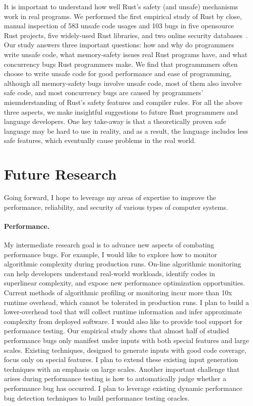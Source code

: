 \documentclass[10pt]{article}
\begin{document}
It is important to understand how well Rust’s safety (and
unsafe) mechanisms work in real programs. We performed
the first empirical study of Rust by close, manual inspection of 583 unsafe code usages 
and 103 bugs in five opensource Rust projects, five widely-used Rust libraries, and two
online security databases~\cite{sosp-boqin}. Our study answers three important 
questions: how and why do programmers write unsafe
code, what memory-safety issues real Rust programs have,
and what concurrency bugs Rust programmers make. 
We find that programmmers often choose to write unsafe code for good performance 
and ease of programming, although all memory-safety bugs involve unsafe code, 
most of them also involve safe code, and 
most concurrency bugs are caused by programmers' misunderstanding of Rust's safety features 
and compiler rules. 
For all the above three aspects, we make insightful suggestions 
to future Rust programmers and language developers. 
One key take-away is that a theoretically proven safe language may be hard to 
use in reality, and as a result, the language includes less safe features, which eventually cause
problems in the real world.

\section{Future Research}

Going forward, I hope to leverage my areas of expertise to improve the performance, 
reliability, and security of various types of computer systems. 

\vspace{-.1in}
\paragraph{Performance.} 
My intermediate research goal is to advance new aspects of combating performance bugs.
For example, I would like to explore how to monitor algorithmic complexity during production runs. 
On-line algorithmic monitoring can help developers understand real-world workloads, 
identify codes in superlinear complexity, 
and expose new performance optimization opportunities. 
Current methods of algorithmic profiling or monitoring incur more than 10x runtime overhead, which cannot be tolerated in production runs. 
I plan to build a lower-overhead tool that will collect runtime information 
and infer approximate complexity from deployed software. 
I would also like to provide tool support for performance testing.
Our empirical study shows that almost half of studied performance bugs only manifest 
under inputs with both special features and large scales.
Existing techniques, designed to generate inputs with good code coverage, focus only on special features.
I plan to extend these existing input generation techniques with an emphasis on large scales. 
Another important challenge that arises during performance testing is how to automatically judge whether a performance bug has occurred. 
I plan to leverage existing dynamic performance bug detection techniques to build performance testing oracles.
\end{document}
